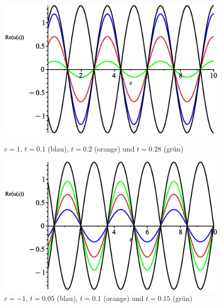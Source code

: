 \documentclass[paper=a4, parskip=half-, ngerman, fontsize=11pt]{scrreprt}
\begin{document}
\begin{figure}[!htpb]
    \vspace{1ex}

    \begin{minipage}{0.45\textwidth}
        \centering
        \includegraphics[width=\linewidth]{../graphics/Enveloppe/verlustlos/R1}
        \caption*{$r=1$, $t=0.1$ (blau), $t=0.2$ (orange) und $t=0.28$ (grün)}
    \end{minipage}\hfill
    \begin{minipage}{0.45\textwidth}
        \centering
        \includegraphics[width=\linewidth]{../graphics/Enveloppe/verlustlos/R-1}
        \caption*{$r=-1$, $t=0.05$ (blau), $t=0.1$ (orange) und $t=0.15$ (grün)}
    \end{minipage}

\end{figure}
\end{document}
